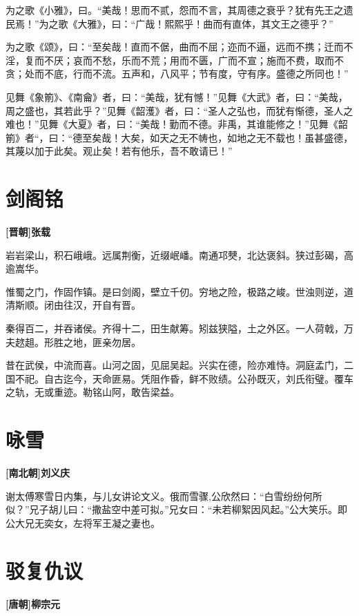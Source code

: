 \documentclass[UTF8,titlepage,oneside]{ctexbook}
\begin{document}
为之歌《小雅》，曰。“美哉！思而不贰，怨而不言，其周德之衰乎？犹有先王之遗民焉！”为之歌《大雅》，曰：“广哉！熙熙乎！曲而有直体，其文王之德乎？”


为之歌《颂》，曰：“至矣哉！直而不倨，曲而不屈；迩而不逼，远而不携；迁而不淫，复而不厌；哀而不愁，乐而不荒；用而不匮，广而不宣；施而不费，取而不贪；处而不底，行而不流。五声和，八风平；节有度，守有序。盛德之所同也！”


见舞《象箾》、《南龠》者，曰：“美哉，犹有憾！”见舞《大武》者，曰：“美哉，周之盛也，其若此乎？”见舞《韶濩》者，曰：“圣人之弘也，而犹有惭德，圣人之难也！”见舞《大夏》者，曰：“美哉！勤而不德。非禹，其谁能修之！”见舞《韶箾》者“，曰：“德至矣哉！大矣，如天之无不帱也，如地之无不载也！虽甚盛德，其蔑以加于此矣。观止矣！若有他乐，吾不敢请已！”



\chapter*{剑阁铭}
\begin{center}
	\textbf{[晋朝]张载}
\end{center}

岩岩梁山，积石峨峨。远属荆衡，近缀岷嶓。南通邛僰，北达褒斜。狭过彭碣，高逾嵩华。

惟蜀之门，作固作镇。是曰剑阁，壁立千仞。穷地之险，极路之峻。世浊则逆，道清斯顺。闭由往汉，开自有晋。

秦得百二，并吞诸侯。齐得十二，田生献筹。矧兹狭隘，土之外区。一人荷戟，万夫趑趄。形胜之地，匪亲勿居。

昔在武侯，中流而喜。山河之固，见屈吴起。兴实在德，险亦难恃。洞庭孟门，二国不祀。自古迄今，天命匪易。凭阻作昏，鲜不败绩。公孙既灭，刘氏衔璧。覆车之轨，无或重迹。勒铭山阿，敢告梁益。


\chapter*{咏雪}
\begin{center}
	\textbf{[南北朝]刘义庆}
\end{center}

谢太傅寒雪日内集，与儿女讲论文义。俄而雪骤,公欣然曰：“白雪纷纷何所似？”兄子胡儿曰：“撒盐空中差可拟。”兄女曰：“未若柳絮因风起。”公大笑乐。即公大兄无奕女，左将军王凝之妻也。


\chapter*{驳复仇议}
\begin{center}
	\textbf{[唐朝]柳宗元}
\end{center}
\end{document}
